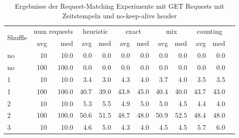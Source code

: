 \documentclass[12pt,a4paper]{report}
\begin{document}
\begin{table}[H]
	\centering
	\caption{Ergebnisse der Request-Matching Experimente mit GET Requests mit Zeitstempeln und no-keep-alive header}
	\label{tab:get_ts_nka}
	\begin{tabular}{|l|r|r|r|r|r|r|r|r|r|r|r|}
		\hline
		\multirow{2}{*}{Shuffle} & \multicolumn{2}{|c|}{num requests} & \multicolumn{2}{|c|}{heuristic} & \multicolumn{2}{|c|}{exact} & \multicolumn{2}{|c|}{mix} & \multicolumn{2}{|c|}{counting}                                    \\ \cline{2-11}
		                         & avg                                & med                             & avg                         & med                       & avg                            & med  & avg  & med  & avg  & med  \\ \hline
		no                       & 10                                 & 10.0                            & 0.0                         & 0.0                       & 0.0                            & 0.0  & 0.0  & 0.0  & 0.0  & 0.0  \\ \hline
		no                       & 100                                & 100.0                           & 0.0                         & 0.0                       & 0.0                            & 0.0  & 0.0  & 0.0  & 0.0  & 0.0  \\ \hline
		1                        & 10                                 & 10.0                            & 3.4                         & 3.0                       & 4.3                            & 4.0  & 3.7  & 4.0  & 3.5  & 3.5  \\ \hline
		1                        & 100                                & 100.0                           & 40.7                        & 39.0                      & 43.8                           & 45.0 & 40.4 & 40.0 & 43.7 & 43.0 \\ \hline
		2                        & 10                                 & 10.0                            & 5.3                         & 5.5                       & 4.9                            & 5.0  & 5.0  & 4.5  & 4.4  & 4.0  \\ \hline
		2                        & 100                                & 100.0                           & 50.6                        & 51.5                      & 48.7                           & 48.0 & 50.9 & 52.5 & 48.4 & 48.0 \\ \hline
		3                        & 10                                 & 10.0                            & 4.6                         & 5.0                       & 4.3                            & 4.0  & 4.5  & 4.5  & 5.7  & 6.0  \\ \hline

\end{tabular}
\end{table}
\end{document}
